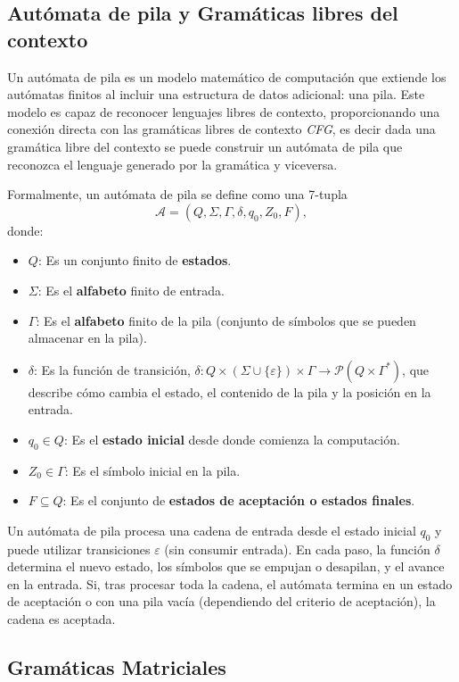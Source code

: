 \documentclass{article}
\begin{document}
\subsection{Autómata de pila y Gramáticas libres del contexto}

Un autómata de pila es un modelo matemático de computación que extiende los autómatas finitos al incluir una estructura de datos adicional: una pila. Este modelo es capaz de reconocer lenguajes libres de contexto,
proporcionando una conexión directa con las gramáticas libres de contexto \textit{CFG}, es decir dada una gramática libre del contexto se puede construir un autómata de pila que reconozca el lenguaje generado por la gramática y viceversa.

Formalmente, un autómata de pila se define como una 7-tupla
\[
      \mathcal{A} = (Q, \Sigma, \Gamma, \delta, q_0, Z_0, F),
\]
donde:

\begin{itemize}
      \item $Q$: Es un conjunto finito de \textbf{estados}.
      \item $\Sigma$: Es el \textbf{alfabeto} finito de entrada.
      \item $\Gamma$: Es el \textbf{alfabeto} finito de la pila (conjunto de símbolos que se pueden almacenar en la pila).
      \item $\delta$: Es la función de transición, $\delta: Q \times (\Sigma \cup \{\varepsilon\}) \times \Gamma \to \mathcal{P}(Q \times \Gamma^*)$, que describe cómo cambia el estado, el contenido de la pila y la posición en la entrada.
      \item $q_0 \in Q$: Es el \textbf{estado inicial} desde donde comienza la computación.
      \item $Z_0 \in \Gamma$: Es el símbolo inicial en la pila.
      \item $F \subseteq Q$: Es el conjunto de \textbf{estados de aceptación o estados finales}.
\end{itemize}

Un autómata de pila procesa una cadena de entrada desde el estado inicial $q_0$ y puede utilizar transiciones $\varepsilon$ (sin consumir entrada). En cada paso, la función $\delta$ determina el nuevo estado, los símbolos que se empujan o desapilan, y el avance en la entrada. Si, tras procesar toda la cadena, el autómata termina en un estado de aceptación o con una pila vacía (dependiendo del criterio de aceptación), la cadena es aceptada.


\subsection{Gramáticas Matriciales}
\end{document}
